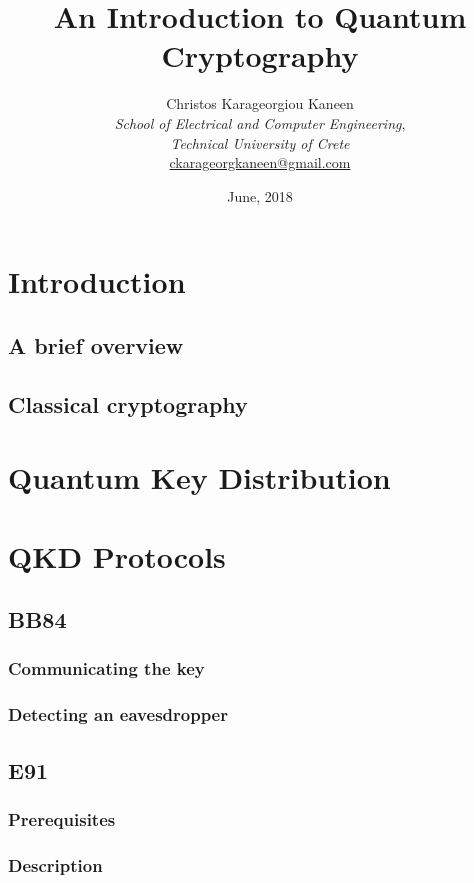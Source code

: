 \documentclass[12pt]{article}
\title{\textbf{An Introduction to Quantum Cryptography}}
\author{{\large Christos Karageorgiou Kaneen}
    \vspace{0.3in}\\
    \emph {School of Electrical and Computer Engineering},\\
    \emph {Technical University of Crete}
    \vspace{0.1in}\\
    \href{mailto:ckarageorgkaneen@gmail.com}
    {ckarageorgkaneen@gmail.com}}
\date{June, 2018}
\def\texinput#1{}
\begin{document}
\maketitle

\begin{abstract}
	\texinput{abstract}
\end{abstract}
\newpage

\section{Introduction}
    \subsection{A brief overview}
        \texinput{a_brief_overview}
    \newpage
    \subsection{Classical cryptography}
        \texinput{classical_cryptography}
    \newpage
\section{Quantum Key Distribution}
    \texinput{quantum_key_distribution}
\newpage
\section{QKD Protocols}
    \subsection{BB84}
        \subsubsection{Communicating the key}
            \texinput{bb84_communicating_the_key}
        \newpage
        \subsubsection{Detecting an eavesdropper}
            \texinput{bb84_detecting_an_eavesdropper}
        \newpage
    \subsection{E91}
        \subsubsection{Prerequisites}
            \texinput{e91_prerequisites}
        \newpage
        \subsubsection{Description}
            \texinput{e91_description}
        \newpage
\end{document}
